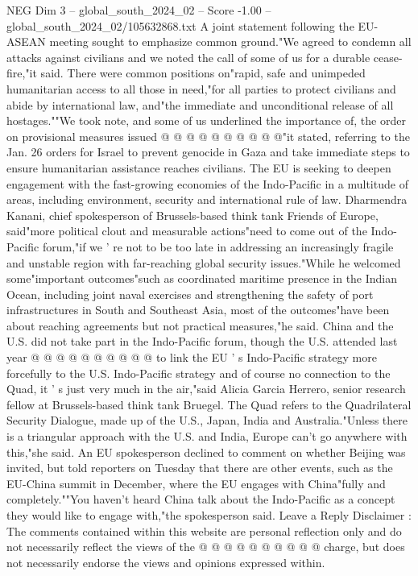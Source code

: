 \begin{textsample}{NEG Dim 3 – global\_south\_2024\_02 – Score -1.00 – global\_south\_2024\_02/105632868.txt}
A joint statement following the EU-ASEAN meeting sought to emphasize common ground."We agreed to condemn all attacks against civilians and we noted the call of some of us for a durable cease-fire,"it said.
There were common positions on"rapid, safe and unimpeded humanitarian access to all those in need,"for all parties to protect civilians and abide by international law, and"the immediate and unconditional release of all hostages.""We took note, and some of us underlined the importance of, the order on provisional measures issued @ @ @ @ @ @ @ @ @ @"it stated, referring to the Jan. 26 orders for Israel to prevent genocide in Gaza and take immediate steps to ensure humanitarian assistance reaches civilians.
The EU is seeking to deepen engagement with the fast-growing economies of the Indo-Pacific in a multitude of areas, including environment, security and international rule of law.
Dharmendra Kanani, chief spokesperson of Brussels-based think tank Friends of Europe, said"more political clout and measurable actions"need to come out of the Indo-Pacific forum,"if we ' re not to be too late in addressing an increasingly fragile and unstable region with far-reaching global security issues."While he welcomed some"important outcomes"such as coordinated maritime presence in the Indian Ocean, including joint naval exercises and strengthening the safety of port infrastructures in South and Southeast Asia, most of the outcomes"have been about reaching agreements but not practical measures,"he said.
China and the U.S. did not take part in the Indo-Pacific forum, though the U.S. attended last year @ @ @ @ @ @ @ @ @ @ to link the EU ' s Indo-Pacific strategy more forcefully to the U.S.
Indo-Pacific strategy and of course no connection to the Quad, it ' s just very much in the air,"said Alicia Garcia Herrero, senior research fellow at Brussels-based think tank Bruegel.
The Quad refers to the Quadrilateral Security Dialogue, made up of the U.S., Japan, India and Australia."Unless there is a triangular approach with the U.S. and India, Europe can't go anywhere with this,"she said.
An EU spokesperson declined to comment on whether Beijing was invited, but told reporters on Tuesday that there are other events, such as the EU-China summit in December, where the EU engages with China"fully and completely.""You haven't heard China talk about the Indo-Pacific as a concept they would like to engage with,"the spokesperson said.
Leave a Reply Disclaimer : The comments contained within this website are personal reflection only and do not necessarily reflect the views of the @ @ @ @ @ @ @ @ @ @ charge, but does not necessarily endorse the views and opinions expressed within.

\end{textsample}

